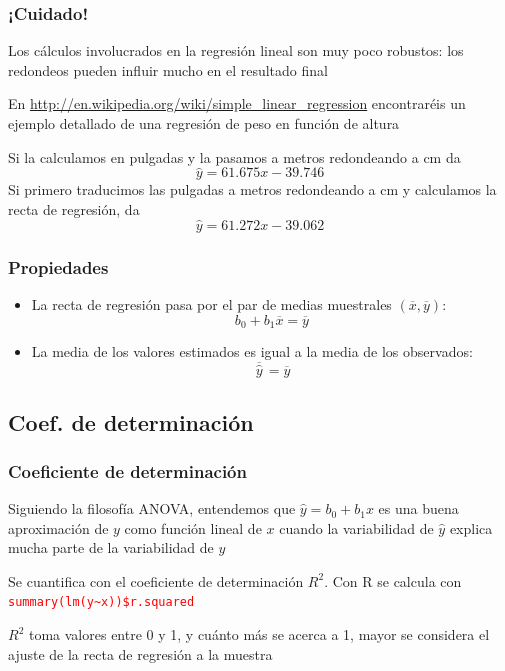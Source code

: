 \documentclass[12pt,t]{beamer}
\newcommand{\red}[1]{\textcolor{red}{#1}}
\newcommand{\blue}[1]{\textcolor{blue}{#1}}
\renewcommand{\emph}[1]{{\color{red}#1}}
\theoremstyle{plain}
\theoremstyle{definition}
\begin{document}
\begin{frame} 
\frametitle{¡Cuidado!}

Los cálculos involucrados en la regresión lineal son muy poco robustos: los redondeos
pueden influir mucho en el resultado final
\bigskip

En \blue{\url{http://en.wikipedia.org/wiki/simple_linear_regression}} encontraréis un ejemplo detallado de una regresión de peso en función de altura
\medskip

Si la calculamos en pulgadas y la pasamos a metros redondeando a cm da 
$$
\widehat{y}=61.675x-39.746
$$
Si primero traducimos las pulgadas a metros redondeando a cm y calculamos la recta de regresión, da
$$
\widehat{y}=61.272x-39.062
$$




\end{frame}


\begin{frame}
\frametitle{Propiedades}

\begin{itemize}
\item La recta de regresión pasa por el par de medias muestrales 
$(\overline{x},\overline{y})$:
$$
b_0+b_1 \overline{x}=\overline{y}
$$

\item La media de los valores estimados es igual a la media de los
observados:
$$
\overline{\,\widehat{y}\,} = \overline{y}
$$
\end{itemize}

\end{frame}

\subsection{Coef. de determinación}%
\begin{frame}
\frametitle{Coeficiente de determinación}

Siguiendo la filosofía ANOVA, entendemos que  $\widehat{y}=b_0+b_1x$ es una buena aproximación de $y$ como función lineal de $x$ cuando la variabilidad de $\widehat{y}$ explica mucha parte de la variabilidad de $y$\bigskip

Se cuantifica con el \emph{coeficiente de determinación $R^2$}. Con R se calcula con
\red{\tt summary(lm(y\~{}x))\$r.squared}\bigskip

$R^2$ toma valores entre 0 y 1, y cuánto más se acerca a 1, mayor se considera el ajuste de la recta de regresión a la muestra

\end{frame}
\end{document}
